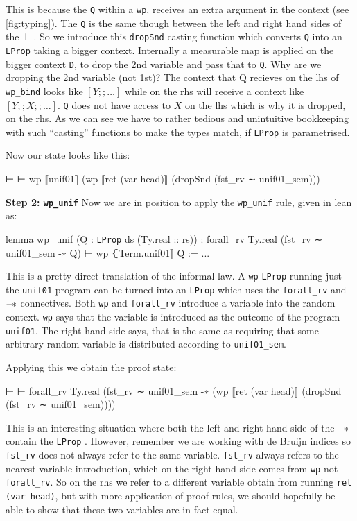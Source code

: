 This is because the \texttt{Q} within a \texttt{wp}, receives an extra argument in the context (see \ref{fig:typing}). The \texttt{Q} is the same though between the left and right hand sides of
the $\vdash$. So we introduce this \texttt{dropSnd} casting function which converts \texttt{Q} into an \texttt{LProp} taking a bigger context. Internally a measurable map
 is applied on the bigger context \texttt{D}, to drop the 2nd variable and pass that to \texttt{Q}. Why are we dropping the 2nd variable (not 1st)?
The context that Q recieves on the lhs of \texttt{wp\_bind} looks like $[Y ;; \ldots]$ while on the rhs  will receive a context like $[Y ;; X ;; \ldots]$. \texttt{Q} does not have
access to $X$ on the lhs which is why it is dropped, on the rhs. As we can see we have to rather tedious and unintuitive bookkeeping with such ``casting'' functions to make the types match, if
\texttt{LProp} is parametrised.

Now our state looks like this:
\begin{leancode}
⊢ 
⊢ wp ⟦unif01⟧ (wp ⟦ret (var head)⟧ (dropSnd (fst_rv ∼ unif01_sem)))
\end{leancode}

\textbf{Step 2: \texttt{wp\_unif}}
Now we are in position to apply the \texttt{wp\_unif} rule, given in lean as:
\begin{leancode}
lemma wp_unif (Q : \texttt{LProp} ds (Ty.real :: rs)) :
    forall_rv Ty.real (fst_rv ∼ unif01_sem -∗ Q) ⊢ wp ⦃Term.unif01⟧ Q := ... 
\end{leancode}

This is a pretty direct translation of the informal law. A \texttt{wp} \texttt{LProp} running just the \texttt{unif01} program can be turned into an \texttt{LProp}
which uses the \texttt{forall\_rv} and $\mathbin{-\!*}$ connectives. Both \texttt{wp} and \texttt{forall\_rv} introduce a variable into the random context. \texttt{wp} says
that the variable is introduced as the outcome of the program \texttt{unif01}. The right hand side says, that is the same as requiring that some arbitrary random
variable is distributed according to \texttt{unif01\_sem}.

Applying this we obtain the proof state:
\begin{leancode}
⊢ 
⊢ forall_rv Ty.real (fst_rv ∼ unif01_sem -∗ 
    (wp ⟦ret (var head)⟧ (dropSnd (fst_rv ∼ unif01_sem))))
\end{leancode}

This is an interesting situation where both the left and right hand side of the $\mathbin{-\!*}$ contain the \texttt{LProp} . However, remember we are working
with de Bruijn indices so \texttt{fst\_rv} does not always refer to the same variable. \texttt{fst\_rv} always refers to the nearest variable introduction, which on the
right hand side comes from \texttt{wp} not \texttt{forall\_rv}. So on the rhs we refer to a different variable obtain from running \texttt{ret (var head)}, but with
more application of proof rules, we should hopefully be able to show that these two variables are in fact equal.

